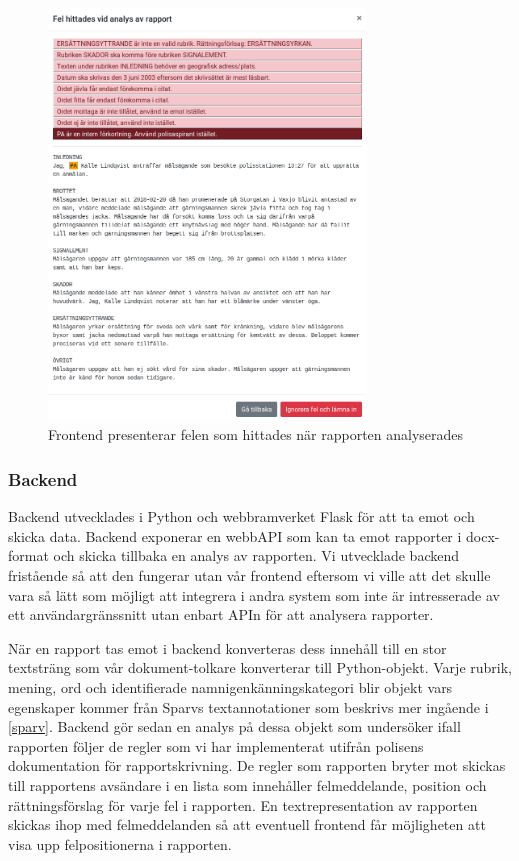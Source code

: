 \documentclass[swedish]{maucsthesis}
\begin{document}
\begin{figure}[H]
    \centering
    \includegraphics[width=0.75\textwidth]{frontenderrors.png}
    \caption{Frontend presenterar felen som hittades när rapporten analyserades}
    \label{fig:frontenderrors}
\end{figure}

\subsubsection{Backend}

Backend utvecklades i Python och webbramverket Flask för att ta emot och skicka
data. Backend exponerar en webbAPI som kan ta emot rapporter i docx-format
och skicka tillbaka en analys av rapporten. Vi utvecklade backend
fristående så att den fungerar utan vår frontend eftersom vi ville att det
skulle vara så lätt som möjligt att integrera i andra system som inte är
intresserade av ett användargränssnitt utan enbart APIn för att analysera
rapporter.

När en rapport tas emot i backend konverteras dess innehåll till en stor
textsträng som vår dokument-tolkare konverterar till Python-objekt. Varje
rubrik, mening, ord och identifierade namnigenkänningskategori blir objekt
vars egenskaper kommer från Sparvs textannotationer som beskrivs mer ingående i \cref{sparv}. Backend gör sedan en analys
på dessa objekt som undersöker ifall rapporten följer de regler som vi har
implementerat utifrån polisens dokumentation för rapportskrivning. De regler som
rapporten bryter mot skickas till rapportens avsändare i en lista som innehåller
felmeddelande, position och rättningsförslag för varje fel i rapporten. En
textrepresentation av rapporten skickas ihop med felmeddelanden så att eventuell
frontend får möjligheten att visa upp felpositionerna i rapporten.
\end{document}
